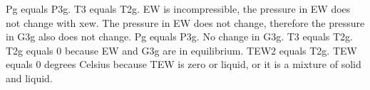 Pg equals P3g. T3 equals T2g. EW is incompressible, the pressure in EW does not change with xew. The pressure in EW does not change, therefore the pressure in G3g also does not change. Pg equals P3g. No change in G3g. T3 equals T2g. T2g equals 0 because EW and G3g are in equilibrium. TEW2 equals T2g. TEW equals 0 degrees Celsius because TEW is zero or liquid, or it is a mixture of solid and liquid.